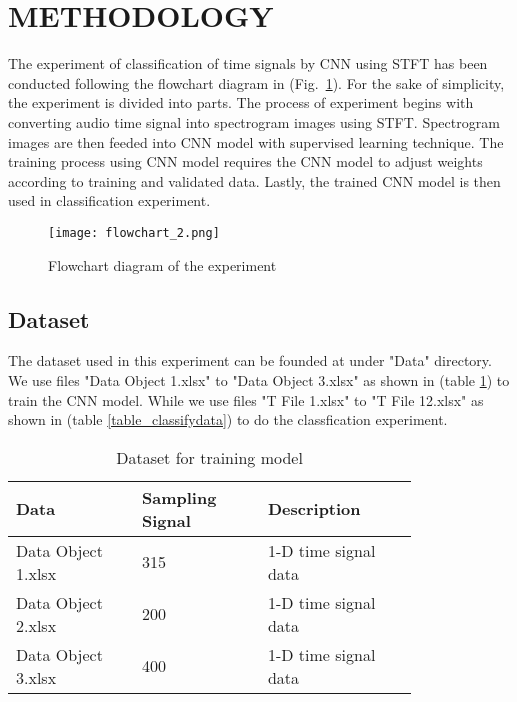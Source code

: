 \documentclass[conference]{IEEEtran}
\begin{document}
\section{METHODOLOGY}

The experiment of classification of time signals by CNN using STFT has been conducted following the flowchart diagram in (Fig.~\ref{fig_flowchart}).
For the sake of simplicity, the experiment is divided into parts. The process of experiment begins with converting audio time signal into spectrogram images using STFT. Spectrogram images are then feeded into CNN model with supervised learning technique. The training process using CNN model requires the CNN model to adjust weights according to training and validated data. Lastly, the trained CNN model is then used in classification experiment.

\newpage
\begin{figure}[htbp]
\centerline{\texttt{[image: flowchart\_2.png]}}
\caption{Flowchart diagram of the experiment}
\label{fig_flowchart}
\end{figure}


\subsection{Dataset}
The dataset used in this experiment can be founded at \cite{b4} under "Data" directory. We use files "Data Object 1.xlsx" to "Data Object 3.xlsx" as shown in (table \ref{table_traindata}) to train the CNN model. While we use files "T File 1.xlsx" to "T File 12.xlsx" as shown in (table \ref{table_classifydata}) to do the classfication experiment. 

\begin{table}[htbp]
\centering
\caption{Dataset for training model}
\begin{tabularx}{0.48\textwidth}{p{0.25\linewidth} | p{0.25\linewidth} | p{0.3\linewidth}}
\hline
Data    & Sampling Signal & Description\\
\hline
Data Object 1.xlsx  &315 & 1-D time signal data\\
Data Object 2.xlsx  &200 & 1-D time signal data\\
Data Object 3.xlsx  &400 & 1-D time signal data\\
\hline
\end{tabularx}
\label{table_traindata}
\end{table}
\end{document}

